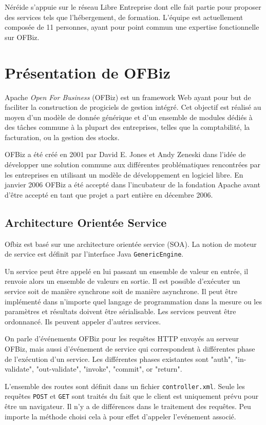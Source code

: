 \documentclass[a4paper, 11pt]{report}
\begin{document}
Néréide s'appuie sur le réseau Libre Entreprise dont elle fait partie
pour proposer des services tels que l'hébergement, de formation.
L'équipe est actuellement composée de 11 personnes, ayant pour point
commun une expertise fonctionnelle sur OFBiz.

\chapter{Présentation de OFBiz}

Apache \emph{Open For Business} (OFBiz) est un framework Web ayant
pour but de faciliter la construction de progiciels de gestion
intégré.  Cet objectif est réalisé au moyen d'un modèle de donnée
générique et d'un ensemble de modules dédiés à des tâches commune à la
plupart des entreprises, telles que la comptabilité, la facturation,
ou la gestion des stocks.

OFBiz a été créé en 2001 par David E. Jones et Andy Zeneski dans
l'idée de développer une solution commune aux différentes
problématiques rencontrées par les entreprises en utilisant un modèle
de développement en logiciel libre. En janvier 2006 OFBiz a été accepté
dans l'incubateur de la fondation Apache avant d'être accepté en tant
que projet a part entière en décembre 2006.

\section{Architecture Orientée Service}

Ofbiz est basé sur une architecture orientée service (SOA).  La notion
de moteur de service est définit par l'interface Java
\verb=GenericEngine=.

Un service peut être appelé en lui passant un ensemble de valeur en
entrée, il renvoie alors un ensemble de valeurs en sortie.  Il est
possible d'exécuter un service soit de manière synchrone soit de
manière asynchrone.  Il peut être implémenté dans n'importe quel
langage de programmation dans la mesure ou les paramètres et résultats
doivent être sérialisable.  Les services peuvent être ordonnancé.  Ils
peuvent appeler d'autres services.

On parle d'événements OFBiz pour les requêtes HTTP envoyés au serveur
OFBiz, mais aussi d'événement de service qui correspondent à
différentes phase de l'exécution d'un service.  Les différentes phases
existantes sont "auth", "in-validate", "out-validate", "invoke",
"commit", or "return".

L'ensemble des routes sont définit dans un fichier
\verb=controller.xml=.  Seule les requêtes \verb=POST= et \verb=GET=
sont traités du fait que le client est uniquement prévu pour être un
navigateur.  Il n'y a de différences dans le traitement des requêtes.
Peu importe la méthode choisi cela à pour effet d'appeler l'evénement
associé.
\end{document}
